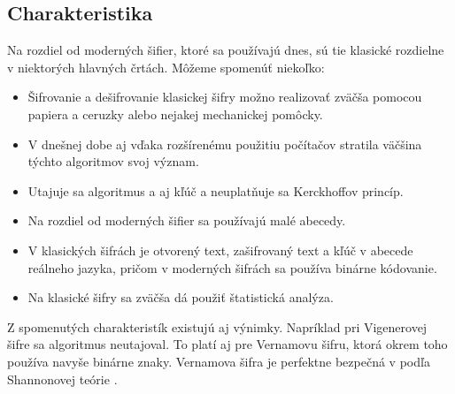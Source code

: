 \subsection{Charakteristika}
Na rozdiel od moderných šifier, ktoré sa používajú dnes, sú tie klasické rozdielne v niektorých hlavných črtách.
Môžeme spomenúť niekoľko:
\begin{itemize}
\item Šifrovanie a dešifrovanie klasickej šifry možno realizovať zväčša pomocou papiera a ceruzky alebo nejakej mechanickej pomôcky.
\item V dnešnej dobe aj vďaka rozšírenému použitiu počítačov stratila väčšina týchto algoritmov svoj význam.
\item Utajuje sa algoritmus a aj kľúč a neuplatňuje sa Kerckhoffov princíp.
\item Na rozdiel od moderných šifier sa používajú malé abecedy.
\item V klasických šifrách je otvorený text, zašifrovaný text a kľúč v abecede reálneho jazyka, pričom v moderných šifrách sa používa binárne kódovanie.
\item Na klasické šifry sa zväčša dá použiť štatistická analýza. 
\end{itemize}
Z spomenutých charakteristík existujú aj výnimky. Napríklad pri Vigenerovej šifre sa algoritmus neutajoval. To platí aj pre Vernamovu šifru, ktorá okrem toho používa navyše binárne znaky. Vernamova šifra je perfektne bezpečná v podľa Shannonovej teórie \cite{ks}.

